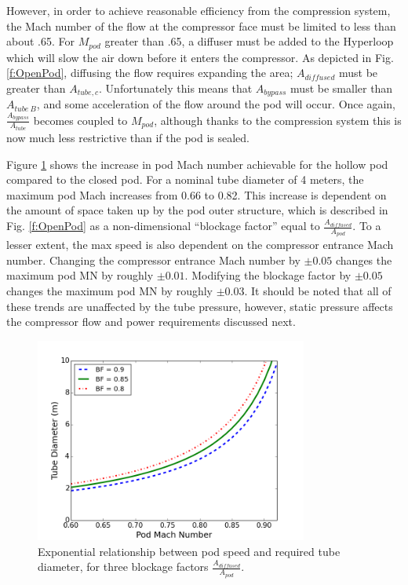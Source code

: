 \documentclass[heading.tex]{subfiles}
\begin{document}
However, in order to achieve reasonable efficiency from the compression system, the Mach number of the flow at the compressor face
must be limited to less than about .65. For $M_{pod}$ greater than .65, a diffuser must be added to the Hyperloop 
which will slow the air down before it enters the compressor. As depicted in Fig. \ref{f:OpenPod}, diffusing the flow 
requires expanding the area; $A_{diffused}$ must be greater than $A_{tube,c}$. Unfortunately this means that
$A_{bypass}$ must be smaller than $A_{tube\ B}$, and some acceleration of the flow around the pod will occur.
Once again, $\frac{A_{bypass}}{A_{tube}}$ becomes coupled to $M_{pod}$, although thanks to the compression 
system this is now much less restrictive than if the pod is sealed. 

Figure \ref{f:machRAD} shows the increase in pod Mach number achievable for the hollow pod compared to the closed pod.
For a nominal tube diameter of 4 meters, the maximum pod Mach increases from 0.66 to 0.82.
This increase is dependent on the amount of space taken up by the pod outer structure, which is described in Fig. \ref{f:OpenPod}
as a non-dimensional ``blockage factor'' equal to $\frac{A_{diffused}}{A_{pod}}$.
To a lesser extent, the max speed is also dependent on the compressor entrance Mach number.
Changing the compressor entrance Mach number by $\pm 0.05$ changes the maximum pod MN by roughly $\pm 0.01$. 
Modifying the blockage factor by $\pm 0.05$ changes the maximum pod MN by roughly $\pm 0.03$.
It should be noted that all of these trends are unaffected by the tube pressure,
however, static pressure affects the compressor flow and power requirements discussed next.


\begin{figure}[H]
\centering
\includegraphics[width=0.8\textwidth]{images/mach_vs_rad6.png}
\caption[Tube and Pod Radius vs Mach]{Exponential relationship between pod speed and required tube diameter, for three blockage factors $\frac{A_{diffused}}{A_{pod}}$.}
\label{f:machRAD}
\end{figure}
\end{document}
